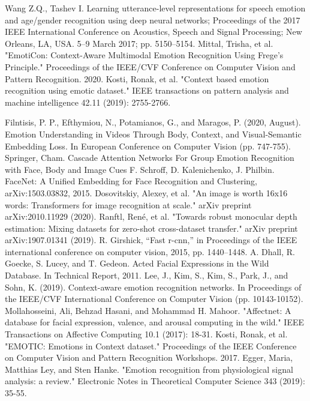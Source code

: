 \documentclass[conference]{IEEEtran}
\begin{document}
\begin{thebibliography}{00}
 Wang Z.Q., Tashev I. Learning utterance-level representations for speech emotion and age/gender recognition using deep neural networks; Proceedings of the 2017 IEEE International Conference on Acoustics, Speech and Signal Processing; New Orleans, LA, USA. 5–9 March 2017; pp. 5150–5154. 
 Mittal, Trisha, et al. "EmotiCon: Context-Aware Multimodal Emotion Recognition Using Frege's Principle." Proceedings of the IEEE/CVF Conference on Computer Vision and Pattern Recognition. 2020.
 Kosti, Ronak, et al. "Context based emotion recognition using emotic dataset." IEEE transactions on pattern analysis and machine intelligence 42.11 (2019): 2755-2766.

 Filntisis, P. P., Efthymiou, N., Potamianos, G., and Maragos, P. (2020, August). Emotion Understanding in Videos Through Body, Context, and Visual-Semantic Embedding Loss. In European Conference on Computer Vision (pp. 747-755). Springer, Cham.
Cascade Attention Networks For Group Emotion Recognition with Face, Body and Image Cues
 F. Schroff, D. Kalenichenko, J. Philbin. FaceNet: A Unified Embedding for Face Recognition and Clustering, arXiv:1503.03832, 2015. 
Dosovitskiy, Alexey, et al. "An image is worth 16x16 words: Transformers for image recognition at scale." arXiv preprint arXiv:2010.11929 (2020).
Ranftl, René, et al. "Towards robust monocular depth estimation: Mixing datasets for zero-shot cross-dataset transfer." arXiv preprint arXiv:1907.01341 (2019).
R. Girshick, “Fast r-cnn,” in Proceedings of the IEEE international conference on computer vision, 2015, pp. 1440–1448.
 A. Dhall, R. Goecke, S. Lucey, and T. Gedeon. Acted Facial Expressions in the Wild Database. In Technical Report, 2011.
   Lee, J., Kim, S., Kim, S., Park, J., and Sohn, K. (2019). Context-aware emotion recognition networks. In Proceedings of the IEEE/CVF International Conference on Computer Vision (pp. 10143-10152).
    Mollahosseini, Ali, Behzad Hasani, and Mohammad H. Mahoor. "Affectnet: A database for facial expression, valence, and arousal computing in the wild." IEEE Transactions on Affective Computing 10.1 (2017): 18-31.
  Kosti, Ronak, et al. "EMOTIC: Emotions in Context dataset." Proceedings of the IEEE Conference on Computer Vision and Pattern Recognition Workshops. 2017.
 Egger, Maria, Matthias Ley, and Sten Hanke. "Emotion recognition from physiological signal analysis: a review." Electronic Notes in Theoretical Computer Science 343 (2019): 35-55.

\end{thebibliography}
\end{document}
